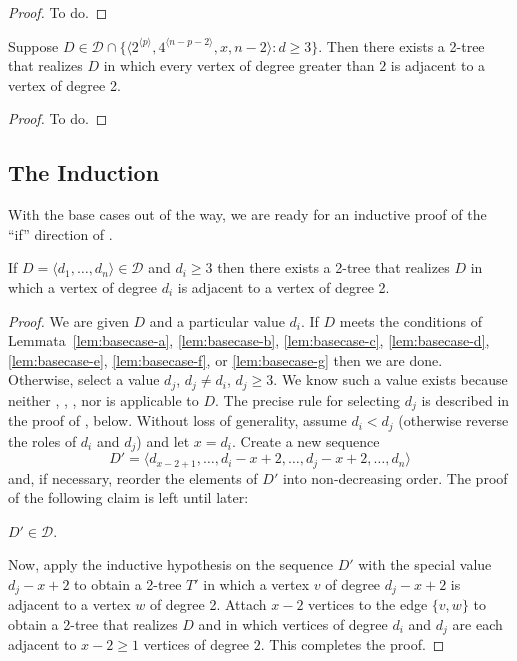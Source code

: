 \documentclass[lotsofwhite,charterfonts]{patmorin}
\newcommand{\rep}[1]{^{\langle#1\rangle}}
\begin{document}
\begin{proof}
To do.
\end{proof}

\begin{lem}
Suppose $D\in \mathcal{D}\cap \{\langle 2\rep{p},4\rep{n-p-2},x,n-2\rangle:
\mbox{$d\ge 3$}\}$.
Then there exists a 2-tree that realizes $D$ in which every vertex of
degree greater than $2$ is adjacent to a vertex of degree 2.
\end{lem}

\begin{proof}
To do.
\end{proof}

\subsection{The Induction}

With the base cases out of the way, we are ready for an inductive
proof of the ``if'' direction of .

\begin{lem}
If $D=\langle d_1,\ldots,d_n\rangle \in \mathcal{D}$ and $d_i\ge 3$
then there exists a 2-tree that realizes $D$ in which a vertex of
degree $d_i$ is adjacent to a vertex of degree 2.  
\end{lem}

\begin{proof}
We are given $D$ and a particular value $d_i$. If $D$ meets the
conditions of Lemmata~\ref{lem:basecase-a}, \ref{lem:basecase-b},
\ref{lem:basecase-c}, \ref{lem:basecase-d}, \ref{lem:basecase-e},
\ref{lem:basecase-f}, or \ref{lem:basecase-g} then we are done.
Otherwise, select a value $d_j$, $d_j\neq d_i$, $d_j\ge 3$.  We know
such a value exists because neither ,
, , nor  is
applicable to $D$. The precise rule for selecting $d_j$ is described
in the proof of , below.  Without loss of generality,
assume $d_i < d_j$ (otherwise reverse the roles of $d_i$ and $d_j$)
and let $x=d_i$.
Create a new sequence 
\[  
   D'=\langle d_{x-2+1},\ldots,d_{i}-x+2,\ldots,d_{j}-x+2,\ldots,d_n \rangle
\] 
and, if necessary, reorder the elements of $D'$ into non-decreasing
order.  The proof of the following claim is left until later:

\begin{clm}
$D'\in \mathcal{D}$.
\end{clm}

Now, apply the inductive hypothesis on the sequence $D'$ with the
special value $d_j-x+2$ to obtain a 2-tree $T'$ in which a vertex $v$
of degree $d_j-x+2$ is adjacent to a vertex $w$ of degree 2.  Attach
$x-2$ vertices to the edge $\{v,w\}$ to obtain a 2-tree that realizes
$D$ and in which vertices of degree $d_i$ and $d_j$ are each adjacent
to $x-2\ge 1$ vertices of degree $2$.  This completes the proof.
\end{proof}
\end{document}
